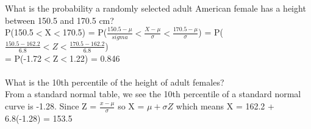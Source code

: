 \documentclass[12pt, a4paper]{article}
\begin{document}
	\noindent What is the probability a randomly selected adult American female has a height between 150.5 and 170.5 cm? \\
	P(150.5$<$X$<$170.5) = P($\frac{150.5-\mu}{sigma}<\frac{X-\mu}{\sigma}<\frac{170.5-\mu}{\sigma}$) = P($\frac{150.5-162.2}{6.8}<Z<\frac{170.5-162.2}{6.8}$) \\ = P(-1.72$<$Z$<$1.22) = 0.846 \\~\\
	What is the 10th percentile of the height of adult females? \\
	From a standard normal table, we see the 10th percentile of a standard normal curve is -1.28. Since Z = $\frac{x-\mu}{\sigma}$ so X = $\mu + \sigma Z$ which means X = 162.2 + 6.8(-1.28) = 153.5 \\~\\
	
\end{document}
